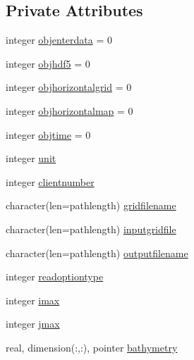 \subsection*{Private Attributes}
\begin{DoxyCompactItemize}
\item 
integer \mbox{\hyperlink{structmodulealadinformat_1_1t__aladinformat_ae32c12741b45d138275239cc114d61b5}{objenterdata}} = 0
\item 
integer \mbox{\hyperlink{structmodulealadinformat_1_1t__aladinformat_ab58e6bf4c360806e8c58d07f81cbf10b}{objhdf5}} = 0
\item 
integer \mbox{\hyperlink{structmodulealadinformat_1_1t__aladinformat_a3fffc51a09ca4e251cf121dda4b4fba5}{objhorizontalgrid}} = 0
\item 
integer \mbox{\hyperlink{structmodulealadinformat_1_1t__aladinformat_afa39e0ec262bf845270e9b700f7a8679}{objhorizontalmap}} = 0
\item 
integer \mbox{\hyperlink{structmodulealadinformat_1_1t__aladinformat_a93aa7f02dfd40bfea133188e5f32823c}{objtime}} = 0
\item 
integer \mbox{\hyperlink{structmodulealadinformat_1_1t__aladinformat_a265db4dfa47bcf9176340f9a536164a5}{unit}}
\item 
integer \mbox{\hyperlink{structmodulealadinformat_1_1t__aladinformat_ad708bb5dcdf6e5ca5357001efd0acb25}{clientnumber}}
\item 
character(len=pathlength) \mbox{\hyperlink{structmodulealadinformat_1_1t__aladinformat_a40c70a6021e70e957e4fac6ff66cc454}{gridfilename}}
\item 
character(len=pathlength) \mbox{\hyperlink{structmodulealadinformat_1_1t__aladinformat_ab7d5394fb45fa85ef9c47a71f027222e}{inputgridfile}}
\item 
character(len=pathlength) \mbox{\hyperlink{structmodulealadinformat_1_1t__aladinformat_ad4a798c7cf379a22ae72d55ef2ccc8e2}{outputfilename}}
\item 
integer \mbox{\hyperlink{structmodulealadinformat_1_1t__aladinformat_a47f431433d44a727de396140d5c49fdb}{readoptiontype}}
\item 
integer \mbox{\hyperlink{structmodulealadinformat_1_1t__aladinformat_a4b62c2b10beca3f38d5034bcde64a3fd}{imax}}
\item 
integer \mbox{\hyperlink{structmodulealadinformat_1_1t__aladinformat_a460a46d1680d3021bf978d70c82c64c7}{jmax}}
\item 
real, dimension(\+:,\+:), pointer \mbox{\hyperlink{structmodulealadinformat_1_1t__aladinformat_a823a69d9a60f96c009f75c96bb447eb2}{bathymetry}}

\end{DoxyCompactItemize}
